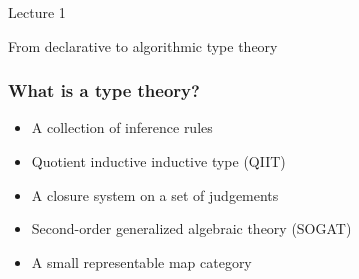 \documentclass[10pt]{beamer}
\begin{document}
\begin{frame}
  \begin{center}
    \Huge Lecture 1

    \bigskip

    \Large
    From declarative to algorithmic type theory
  \end{center}
\end{frame}


\begin{frame}
  \frametitle{What is a type theory?}

  \begin{itemize}
  \item A collection of inference rules
  \item Quotient inductive inductive type (QIIT)
  \item A closure system on a set of judgements
  \item Second-order generalized algebraic theory (SOGAT)
  \item A small representable map category
  \end{itemize}

\end{frame}
\end{document}
